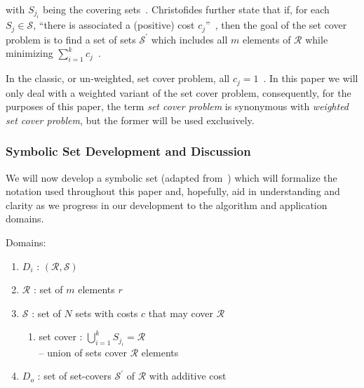 \documentclass[conference]{IEEEtran}
\begin{document}
\noindent with $S_{j_i}$ being the covering sets~\cite[pp.
39-40]{christofides1975}. Christofides further state that if, for each $S_j \in
\mathcal{S}$, ``there is associated a (positive) cost $c_j$''~\cite[p.
39]{christofides1975}, then the goal of the set cover problem is to find a set
of sets $\mathcal{S}^\prime$ which includes all $m$ elements of $\mathcal{R}$
while minimizing $\sum_{i = 1}^k c_j$~\cite{christofides1975, stern2006,
talbi2009, wiki:SCP}. 

In the classic, or un-weighted, set cover problem, all ${c_j =
1}$~\cite{stern2006}. In this paper we will only deal with a weighted variant
of the set cover problem, consequently, for the purposes of this paper, the
term \textit{set cover problem} is synonymous with \textit{weighted set cover
problem}, but the former will be used exclusively.

\subsubsection{Symbolic Set Development and Discussion} \label{sec:symbol}
We will now develop a symbolic set (adapted from~\cite{christofides1975,
lamontSCP}) which will formalize the notation used throughout this paper and,
hopefully, aid in understanding and clarity as we progress in our development
to the algorithm and application domains.

Domains:
\begin{enumerate}
  \item[] $D_i$ : $(\mathcal{R,S})$
  \item[] $\mathcal{R}$ : set of $m$ elements $r$
  \item[] $\mathcal{S}$ : set of $N$ sets with costs $c$ that may cover
    $\mathcal{R}$
    \begin{enumerate}
      \item[] set cover : $\bigcup\limits_{i=1}^k S_{j_i} =
        \mathcal{R}$~\cite[Eq.~3.12]{christofides1975}\\ 
        -- union of sets cover $\mathcal{R}$
        elements
    \end{enumerate}
  \item[] $D_o$ : set of set-covers $\mathcal{S}^\prime$ of $\mathcal{R}$ with
    additive cost
\end{enumerate}

\end{document}
